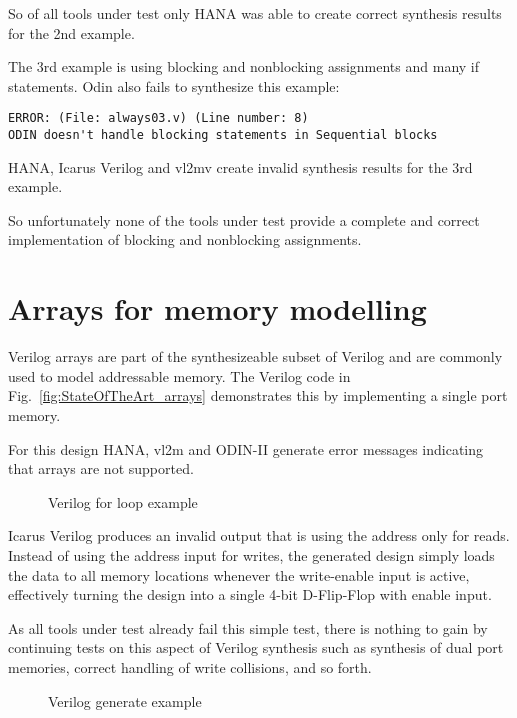 So of all tools under test only HANA was able to create correct synthesis results
for the 2nd example.

The 3rd example is using blocking and nonblocking assignments and many if statements.
Odin also fails to synthesize this example:

\begin{verbatim}
ERROR: (File: always03.v) (Line number: 8)
ODIN doesn't handle blocking statements in Sequential blocks
\end{verbatim}

HANA, Icarus Verilog and vl2mv create invalid synthesis results for the 3rd example.

So unfortunately none of the tools under test provide a complete and correct
implementation of blocking and nonblocking assignments.

\section{Arrays for memory modelling}

Verilog arrays are part of the synthesizeable subset of Verilog and are
commonly used to model addressable memory. The Verilog code in
Fig.~\ref{fig:StateOfTheArt_arrays} demonstrates this by implementing a single
port memory.

For this design HANA, vl2m and ODIN-II generate error messages indicating that
arrays are not supported.

\begin{figure}[t!]
	
	\caption{Verilog for loop example}
	\label{fig:StateOfTheArt_for}
\end{figure}

Icarus Verilog produces an invalid output that is using the address only for
reads. Instead of using the address input for writes, the generated design
simply loads the data to all memory locations whenever the write-enable input
is active, effectively turning the design into a single 4-bit D-Flip-Flop with
enable input.

As all tools under test already fail this simple test, there is nothing to gain
by continuing tests on this aspect of Verilog synthesis such as synthesis of dual port
memories, correct handling of write collisions, and so forth.

\begin{figure}[t!]
	
	\caption{Verilog generate example}
	\label{fig:StateOfTheArt_gen}
\end{figure}

